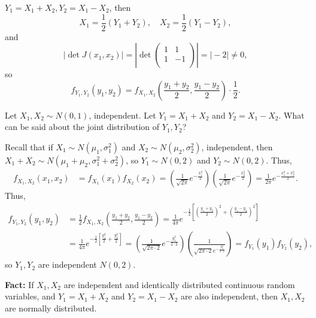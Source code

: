\begin{eg}
    \(Y_1 = X_1 + X_2, Y_2 = X_1 - X_2\), then 
    \[
        X_1 = \frac{1}{2} \left( Y_1 + Y_2 \right), \quad X_2 = \frac{1}{2} \left( Y_1 - Y_2 \right),  
    \] 
    and 
    \[
        \left\vert \det J(x_1, x_2) \right\vert  = \left\vert \det \begin{pmatrix}
            1 & 1  \\
            1 & -1  \\
        \end{pmatrix} \right\vert = \vert -2 \vert  \neq 0, 
    \]
    so 
    \[
        f_{Y_1, Y_2} (y_1, y_2) = f_{X_1, X_2} \left( \frac{y_1 + y_2}{2}, \frac{y_1 - y_2}{2} \right) \cdot \frac{1}{2}. 
    \]
\end{eg}

\begin{eg}
    Let \(X_1, X_2 \sim N(0, 1)\), independent. Let \(Y_1 = X_1 + X_2\) and \(Y_2 = X_1 - X_2\). What can be said about the joint distribution of \(Y_1, Y_2\)?    
\end{eg}
\begin{explanation}
    Recall that if \(X_1 \sim N(\mu _1, \sigma _1^2)\) and \(X_2 \sim N(\mu _2, \sigma _2^2)\), independent, then \(X_1 + X_2 \sim N(\mu _1 + \mu _2, \sigma _1^2 + \sigma _2^2)\), so \(Y_1 \sim N(0, 2)\) and \(Y_2 \sim N(0, 2)\). Thus, 
    \begin{align*}
        f_{X_1, X_2} (x_1, x_2) &= f_{X_1}(x_1) f_{X_2}(x_2) = \left( \frac{1}{\sqrt{2\pi } } e^{- \frac{x_1^2}{2}} \right) \left( \frac{1}{\sqrt{2 \pi} } e^{- \frac{x_2^2}{2}} \right) = \frac{1}{2 \pi } e^{- \frac{x_1^2 + x_2^2}{2}}.  
    \end{align*}     
    Thus, 
    \begin{align*}
        f_{Y_1, Y_2} (y_1, y_2) &= \frac{1}{2} f_{X_1, X_2} \left( \frac{y_1 + y_2}{2}, \frac{y_1 - y_2}{2} \right) = \frac{1}{4 \pi} e^{-\frac{1}{2} \left[ \left( \frac{y_1 + y_2}{2} \right)^2 + \left( \frac{y_1 - y_2}{2} \right)^2   \right] } \\
        &= \frac{1}{4 \pi} e^{-\frac{1}{2} \left[ \frac{y_1^2}{2} + \frac{y_2^2}{2} \right] } = \left( \frac{1}{\sqrt{2\pi \cdot 2} } e^{- \frac{y_1^2}{2 \cdot 2}} \right) \left( \frac{1}{\sqrt{2\pi \cdot 2} e^{-\frac{y_2^2}{2 \cdot 2}}} \right) = f_{Y_1}(y_1) f_{Y_2}(y_2),   
    \end{align*}
    so \(Y_1, Y_2\) are independent \(N(0, 2)\).  
\end{explanation}

\textbf{Fact:} If \(X_1, X_2\) are independent and identically distributed continuous random variables, and \(Y_1 = X_1 + X_2\) and \(Y_2 = X_1 - X_2\) are also independent, then \(X_1, X_2\) are normally distributed. 

